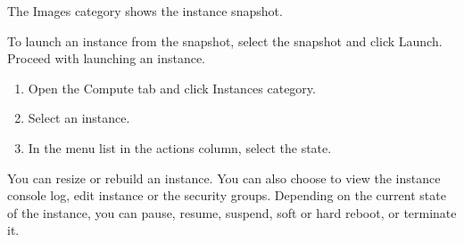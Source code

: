 The Images category shows the instance snapshot.

To launch an instance from the snapshot, select the snapshot and click
Launch. Proceed with launching an instance.

\label{manage-an-instance}

\begin{enumerate}
\def\labelenumi{\arabic{enumi}.}
\item Open the Compute tab and click Instances category.
\item Select an instance.
\item In the menu list in the actions column, select the state.
\end{enumerate}

You can resize or rebuild an instance. You can also choose to view the
instance console log, edit instance or the security groups. Depending on
the current state of the instance, you can pause, resume, suspend, soft
or hard reboot, or terminate it.

